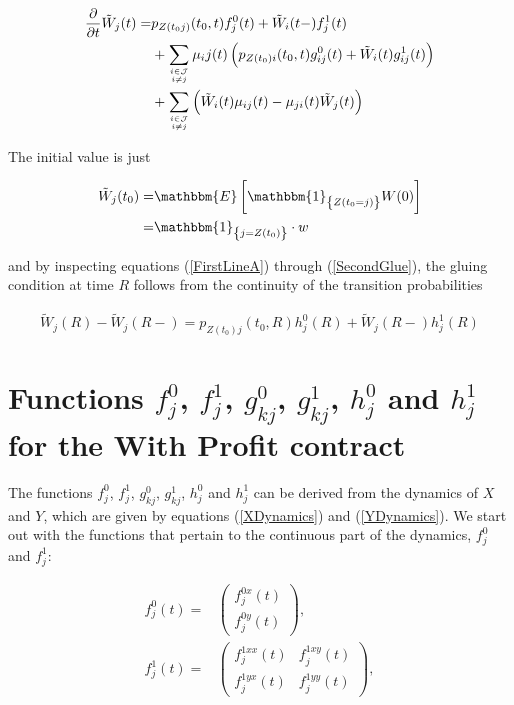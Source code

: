 \documentclass{article}
\newcommand{\1}[1]{\mathbbm{1}_{\left\lbrace #1 \right\rbrace}}
\newcommand{\expec}[1][def]{\mathbbm{E} \left[ #1 \right]}
\theoremstyle{break}
\theoremstyle{remark}
\numberwithin{equation}{section}
\begin{document}
\begin{appendices}
\begin{align*}
	\frac{\partial}{\partial t} \tilde{W}_j(t) =& p_{Z(t_0j)}(t_0,t) f_j^0(t) + \tilde{W}_i(t-) f_j^1(t) \\
	&+ \sum_{i \in \mathcal{J} \atop i \neq j} \mu_ij(t) \left( p_{Z(t_0)i}(t_0,t) g_{ij}^0(t) + \tilde{W}_i(t) g_{ij}^1(t) \right) \\
	&+ \sum_{i \in \mathcal{J} \atop i \neq j} \left( \tilde{W}_i(t) \mu_{ij}(t) - \mu_{ji}(t) \tilde{W}_j(t) \right)
\end{align*}

The initial value is just

\begin{align*}
	\tilde{W}_j(t_0) =& \expec[\1{Z(t_0=j)} W(0)] \\
	=& \1{j=Z(t_0)} \cdot w
\end{align*}

and by inspecting equations (\ref{FirstLineA}) through (\ref{SecondGlue}), the gluing condition at time $R$ follows from the continuity of the transition probabilities

\begin{align*}
	\tilde{W}_j(R) - \tilde{W}_j(R-) = p_{Z(t_0)j}(t_0,R) h_j^0(R) + \tilde{W}_j(R-) h_j^1(R)
\end{align*}

\newpage
\section{Functions $f_j^0$, $f_j^1$, $g_{kj}^0$, $g_{kj}^1$, $h_j^0$ and $h_j^1$ for the With Profit contract} \label{AppendixFunctions}

The functions $f_j^0$, $f_j^1$, $g_{kj}^0$, $g_{kj}^1$, $h_j^0$ and $h_j^1$ can be derived from the dynamics of $X$ and $Y$, which are given by equations (\ref{XDynamics}) and (\ref{YDynamics}). We start out with the functions that pertain to the continuous part of the dynamics, $f_j^0$ and $f_j^1$:

\begin{align*}
f_j^0(t) =&
\begin{pmatrix}
	f_j^{0x}(t) \\
	f_j^{0y}(t) 
\end{pmatrix}, \\
f_j^1(t) =&
\begin{pmatrix}
	f_j^{1xx}(t) & f_j^{1xy}(t) \\
	f_j^{1yx}(t) & f_j^{1yy}(t)
\end{pmatrix},
\end{align*}


\end{appendices}
\end{document}
